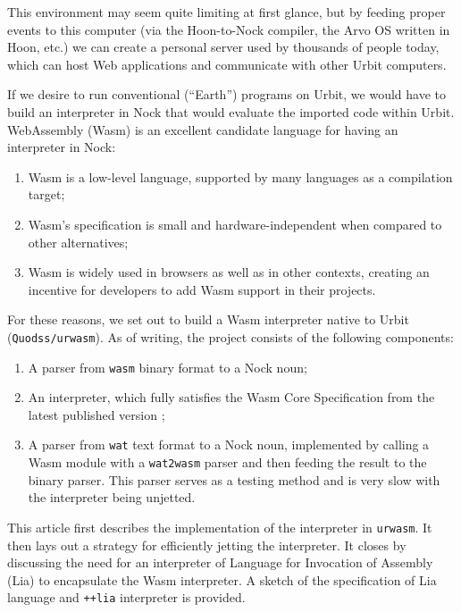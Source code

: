 \documentclass[twoside]{article}
\begin{document}
This environment may seem quite limiting at first glance, but by feeding proper events to this computer (via the Hoon-to-Nock compiler, the Arvo OS written in Hoon, etc.) we can create a personal server used by thousands of people today, which can host Web applications and communicate with other Urbit computers.

If we desire to run conventional (“Earth”) programs on Urbit, we would have to build an interpreter in Nock that would evaluate the imported code within Urbit. WebAssembly (Wasm) is an excellent candidate language for having an interpreter in Nock:

\begin{enumerate}
  \item  Wasm is a low-level language, supported by many languages as a compilation target;
  \item  Wasm's specification is small and hardware-independent when compared to other alternatives;
  \item  Wasm is widely used in browsers as well as in other contexts, creating an incentive for developers to add Wasm support in their projects.
\end{enumerate}

\noindent
For these reasons, we set out to build a Wasm interpreter native to Urbit (\texttt{Quodss/urwasm}). As of writing, the project consists of the following components:

\begin{enumerate}
  \item  A parser from \texttt{wasm} binary format to a Nock noun;
  \item  \sloppy An interpreter, which fully satisfies the Wasm Core Specification from the latest published version \citep{Wasm2024};
  \item  A parser from \texttt{wat} text format to a Nock noun, implemented by calling a Wasm module with a \texttt{wat2wasm} parser and then feeding the result to the binary parser. This parser serves as a testing method and is very slow with the interpreter being unjetted.
\end{enumerate}

This article first describes the implementation of the interpreter in \texttt{urwasm}.  It then lays out a strategy for efficiently jetting the interpreter.  It closes by discussing the need for an interpreter of Language for Invocation of Assembly (Lia) to encapsulate the Wasm interpreter.  A sketch of the specification of Lia language and \lstinline[style=inlinecode]{++lia} interpreter is provided.
\end{document}
